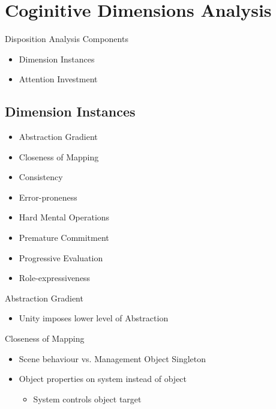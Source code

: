 \section{Coginitive Dimensions Analysis}
\begin{frame}{\secname}{Disposition}
	Analysis Components
	\begin{itemize}
		\item Dimension Instances
		\item Attention Investment
	\end{itemize}
\end{frame}

\subsection{Dimension Instances}
\begin{frame}{\secname}{\subsecname}
	\begin{itemize}
		\item Abstraction Gradient
		\item Closeness of Mapping
		\item Consistency
		\item Error-proneness
		\item Hard Mental Operations
		\item Premature Commitment
		\item Progressive Evaluation
		\item Role-expressiveness
	\end{itemize}
\end{frame}

\begin{frame}{\secname}{\subsecname}
	Abstraction Gradient
	\begin{itemize}
		\item Unity imposes lower level of Abstraction
	\end{itemize}
\end{frame}

\begin{frame}{\secname}{\subsecname}
	Closeness of Mapping
	\begin{itemize}
		\item Scene behaviour vs. Management Object Singleton
		\item Object properties on system instead of object
		\begin{itemize}
			\item System controls object target
		\end{itemize}
	\end{itemize}
\end{frame}

